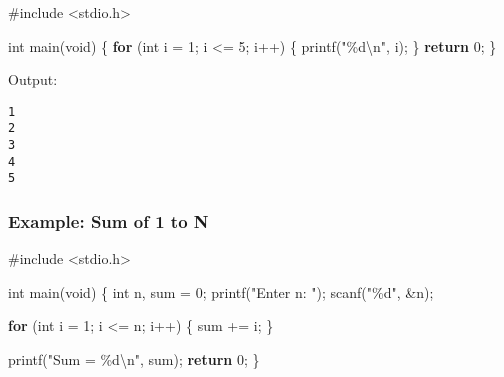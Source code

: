 \documentclass[
  letterpaper,
  DIV=11,
  numbers=noendperiod]{scrreprt}
\newenvironment{Shaded}{\begin{snugshade}}{\end{snugshade}}
\newcommand{\ControlFlowTok}[1]{\textcolor[rgb]{0.00,0.23,0.31}{\textbf{#1}}}
\newcommand{\DataTypeTok}[1]{\textcolor[rgb]{0.68,0.00,0.00}{#1}}
\newcommand{\DecValTok}[1]{\textcolor[rgb]{0.68,0.00,0.00}{#1}}
\newcommand{\ImportTok}[1]{\textcolor[rgb]{0.00,0.46,0.62}{#1}}
\newcommand{\NormalTok}[1]{\textcolor[rgb]{0.00,0.23,0.31}{#1}}
\newcommand{\OperatorTok}[1]{\textcolor[rgb]{0.37,0.37,0.37}{#1}}
\newcommand{\PreprocessorTok}[1]{\textcolor[rgb]{0.68,0.00,0.00}{#1}}
\newcommand{\SpecialCharTok}[1]{\textcolor[rgb]{0.37,0.37,0.37}{#1}}
\newcommand{\StringTok}[1]{\textcolor[rgb]{0.13,0.47,0.30}{#1}}
\begin{document}
\begin{Shaded}
\begin{Highlighting}[]
\PreprocessorTok{\#include }\ImportTok{\textless{}stdio.h\textgreater{}}

\DataTypeTok{int}\NormalTok{ main}\OperatorTok{(}\DataTypeTok{void}\OperatorTok{)} \OperatorTok{\{}
    \ControlFlowTok{for} \OperatorTok{(}\DataTypeTok{int}\NormalTok{ i }\OperatorTok{=} \DecValTok{1}\OperatorTok{;}\NormalTok{ i }\OperatorTok{\textless{}=} \DecValTok{5}\OperatorTok{;}\NormalTok{ i}\OperatorTok{++)} \OperatorTok{\{}
\NormalTok{        printf}\OperatorTok{(}\StringTok{"}\SpecialCharTok{\%d\textbackslash{}n}\StringTok{"}\OperatorTok{,}\NormalTok{ i}\OperatorTok{);}
    \OperatorTok{\}}
    \ControlFlowTok{return} \DecValTok{0}\OperatorTok{;}
\OperatorTok{\}}
\end{Highlighting}
\end{Shaded}

Output:

\begin{verbatim}
1
2
3
4
5
\end{verbatim}

\subsubsection{Example: Sum of 1 to N}\label{example-sum-of-1-to-n}

\begin{Shaded}
\begin{Highlighting}[]
\PreprocessorTok{\#include }\ImportTok{\textless{}stdio.h\textgreater{}}

\DataTypeTok{int}\NormalTok{ main}\OperatorTok{(}\DataTypeTok{void}\OperatorTok{)} \OperatorTok{\{}
    \DataTypeTok{int}\NormalTok{ n}\OperatorTok{,}\NormalTok{ sum }\OperatorTok{=} \DecValTok{0}\OperatorTok{;}
\NormalTok{    printf}\OperatorTok{(}\StringTok{"Enter n: "}\OperatorTok{);}
\NormalTok{    scanf}\OperatorTok{(}\StringTok{"}\SpecialCharTok{\%d}\StringTok{"}\OperatorTok{,} \OperatorTok{\&}\NormalTok{n}\OperatorTok{);}

    \ControlFlowTok{for} \OperatorTok{(}\DataTypeTok{int}\NormalTok{ i }\OperatorTok{=} \DecValTok{1}\OperatorTok{;}\NormalTok{ i }\OperatorTok{\textless{}=}\NormalTok{ n}\OperatorTok{;}\NormalTok{ i}\OperatorTok{++)} \OperatorTok{\{}
\NormalTok{        sum }\OperatorTok{+=}\NormalTok{ i}\OperatorTok{;}
    \OperatorTok{\}}

\NormalTok{    printf}\OperatorTok{(}\StringTok{"Sum = }\SpecialCharTok{\%d\textbackslash{}n}\StringTok{"}\OperatorTok{,}\NormalTok{ sum}\OperatorTok{);}
    \ControlFlowTok{return} \DecValTok{0}\OperatorTok{;}
\OperatorTok{\}}
\end{Highlighting}
\end{Shaded}
\end{document}
